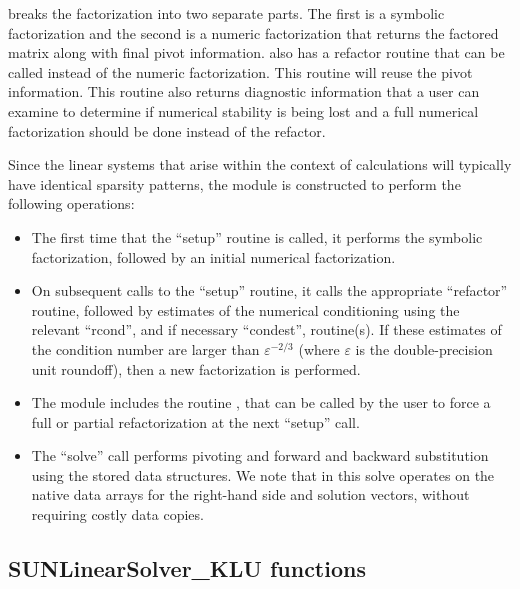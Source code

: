 {\klu} breaks the factorization into two separate parts.  The first is
a symbolic factorization and the second is a numeric factorization
that returns the factored matrix along with final pivot information.
{\klu} also has a refactor routine that can be called instead of the numeric
factorization.  This routine will reuse the pivot information.  This routine
also returns diagnostic information that a user can examine to determine if
numerical stability is being lost and a full numerical factorization should
be done instead of the refactor.

Since the linear systems that arise within the context of {\sundials}
calculations will typically have identical sparsity patterns, the
{\sunlinsolklu} module is constructed to perform the
following operations:
\begin{itemize}
\item The first time that the ``setup'' routine is called, it
  performs the symbolic factorization, followed by an initial
  numerical factorization.
\item On subsequent calls to the ``setup'' routine, it calls the
  appropriate {\klu} ``refactor'' routine, followed by estimates of
  the numerical conditioning using the relevant ``rcond'', and if
  necessary ``condest'', routine(s).  If these estimates of the
  condition number are larger than $\varepsilon^{-2/3}$ (where
  $\varepsilon$ is the double-precision unit roundoff), then a new
  factorization is performed.
\item The module includes the routine , that
  can be called by the user to force a full or partial refactorization
  at the next ``setup'' call.
\item The ``solve'' call performs pivoting and forward and
  backward substitution using the stored {\klu} data structures.  We
  note that in this solve {\klu} operates on the native data arrays
  for the right-hand side and solution vectors, without requiring
  costly data copies.
\end{itemize}


\subsection{SUNLinearSolver\_KLU functions}
\label{ss:sunlinsol_klu_functions}

